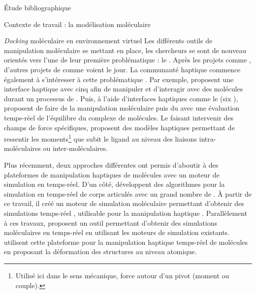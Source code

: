 \documentclass[myfrancais,ngerman,english,french]{mythesis}
\begin{document}
\begin{mychapter}{Étude bibliographique}
\begin{mysection}{Contexte de travail : la modélisation moléculaire}
\begin{mysubsection}{\textit{Docking} moléculaire en environnement virtuel}
				Les différents outils de manipulation moléculaire se mettant en place, les chercheurs se sont de nouveau orientés vers l'une de leur première problématique : le .
				Après les projets comme \myGROPE, d'autres projets de  comme \mySTALK {} voient le jour.
				La communauté haptique commence également à s'intéresser à cette problématique .
				Par exemple,  proposent une interface haptique avec cinq   afin de manipuler et d'interagir avec des molécules durant un processus de  .
				Puis, à l'aide d'interfaces haptiques comme le \myVirtuose (six ),  proposent de faire de la manipulation moléculaire puis du   avec une évaluation temps-réel de l'équilibre du complexe de molécules.
				Le  faisant intervenir des champs de force spécifiques,  proposent des modèles haptiques permettant de ressentir les moments\footnote{Utilisé ici dans le sens mécanique, force autour d'un pivot (moment ou couple).} que subit le ligand au niveau des liaisons intra-moléculaires ou inter-moléculaires.

				Plus récemment, deux approches différentes ont permis d'aboutir à des plateformes de manipulation haptiques de molécules avec un moteur de simulation en temps-réel.
				D'un côté,  développent des algorithmes pour la simulation en temps-réel de corps articulés avec un grand nombre de .
				À partir de ce travail, il créé un moteur de simulation moléculaire permettant d'obtenir des simulations temps-réel , utilisable pour la manipulation haptique .
				Parallèlement à ces travaux,  proposent un outil permettant d'obtenir des simulations moléculaires en temps-réel en utilisant les moteurs de simulation existants.
				 utilisent cette plateforme pour la manipulation haptique temps-réel de molécules en proposant la déformation des structures au niveau atomique.

				\begin{myfigure}
				\end{myfigure}


\end{mysubsection}
\end{mysection}
\end{mychapter}
\end{document}
